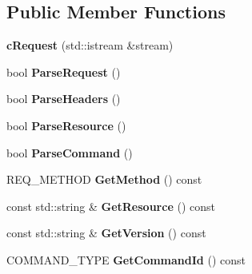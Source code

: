 \subsection*{Public Member Functions}
\begin{DoxyCompactItemize}
\item 
\hypertarget{classhttp__server_1_1cRequest_aa3cadbdda5c1ad42a29f182bddc94fb1}{{\bfseries c\-Request} (std\-::istream \&stream)}\label{classhttp__server_1_1cRequest_aa3cadbdda5c1ad42a29f182bddc94fb1}

\item 
\hypertarget{classhttp__server_1_1cRequest_ac9531a813f05222ee24c7a27d2ec90fd}{bool {\bfseries Parse\-Request} ()}\label{classhttp__server_1_1cRequest_ac9531a813f05222ee24c7a27d2ec90fd}

\item 
\hypertarget{classhttp__server_1_1cRequest_a4042e926a9005f96117d0f24f6987ac0}{bool {\bfseries Parse\-Headers} ()}\label{classhttp__server_1_1cRequest_a4042e926a9005f96117d0f24f6987ac0}

\item 
\hypertarget{classhttp__server_1_1cRequest_ab623c396e4dbde0253c99c0a609f275f}{bool {\bfseries Parse\-Resource} ()}\label{classhttp__server_1_1cRequest_ab623c396e4dbde0253c99c0a609f275f}

\item 
\hypertarget{classhttp__server_1_1cRequest_a8acb2b752932b8fcb298902adca4987d}{bool {\bfseries Parse\-Command} ()}\label{classhttp__server_1_1cRequest_a8acb2b752932b8fcb298902adca4987d}

\item 
\hypertarget{classhttp__server_1_1cRequest_af0c3d838c88fef758115eda75cd66835}{R\-E\-Q\-\_\-\-M\-E\-T\-H\-O\-D {\bfseries Get\-Method} () const }\label{classhttp__server_1_1cRequest_af0c3d838c88fef758115eda75cd66835}

\item 
\hypertarget{classhttp__server_1_1cRequest_a808d2f736c751db6d111d2cbb2458470}{const std\-::string \& {\bfseries Get\-Resource} () const }\label{classhttp__server_1_1cRequest_a808d2f736c751db6d111d2cbb2458470}

\item 
\hypertarget{classhttp__server_1_1cRequest_a9f1fbe83f22a917f75085326b96a5577}{const std\-::string \& {\bfseries Get\-Version} () const }\label{classhttp__server_1_1cRequest_a9f1fbe83f22a917f75085326b96a5577}

\item 
\hypertarget{classhttp__server_1_1cRequest_a51ccd6f85abf1eb131bd3e2c10ad2f59}{C\-O\-M\-M\-A\-N\-D\-\_\-\-T\-Y\-P\-E {\bfseries Get\-Command\-Id} () const }\label{classhttp__server_1_1cRequest_a51ccd6f85abf1eb131bd3e2c10ad2f59}


\end{DoxyCompactItemize}
